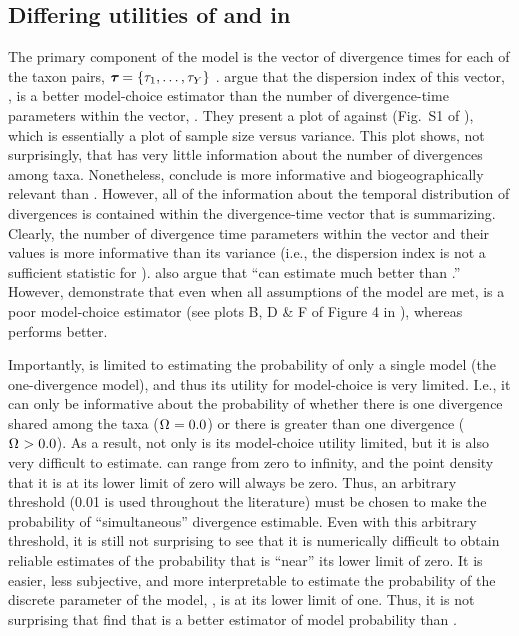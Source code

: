 \subsection{Differing utilities of \numt{} and \vmratio{} in \msb}
The primary component of the \msb model is the vector of divergence
times for each of the taxon pairs,
$\boldsymbol{\tau_{}} = \{\tau_{1}, \ldots, \tau_{Y}\}$
\citep{Oaks2012}.
\citet{Hickerson2013} argue that the dispersion index of this vector,
\vmratio{}, is a better model-choice estimator than the number of 
divergence-time parameters within the vector,
\numt{}.
They present a plot of \numt{} against \vmratio{} (Fig.~S1 of
\citet{Hickerson2013}), which is essentially a plot of sample size versus
variance.
This plot shows, not surprisingly, that \vmratio{} has very little information
about the number of divergences among taxa.
Nonetheless, \citet{Hickerson2013} conclude \vmratio{} is more informative and
biogeographically relevant than \numt{}.
However, all of the information about the temporal distribution of divergences
is contained within the divergence-time vector that \vmratio{} is summarizing.
Clearly, the number of divergence time parameters within the vector and their
values is more informative than its variance (i.e., the dispersion index is not
a sufficient statistic for \divtvector).
\citet{Hickerson2013} also argue that ``\msb can estimate \vmratio{} much
better than \numt{}.''
However, \citet{Oaks2012} demonstrate that even when all assumptions of the
model are met, \vmratio{} is a poor model-choice estimator (see plots B, D \& F
of Figure 4 in \citet{Oaks2012}), whereas \numt{} performs better.

Importantly, \vmratio{} is limited to estimating the probability of only a
single model (the one-divergence model), and thus its utility for model-choice
is very limited.
I.e., it can only be informative about the probability of whether there is one
divergence shared among the taxa ($\Omega_{} = 0.0$) or there is greater than
one divergence ($\Omega_{} > 0.0$).
As a result, not only is its model-choice utility limited, but it is also
very difficult to estimate.
\vmratio{} can range from zero to infinity, and the point density that it is
at its lower limit of zero will always be zero.
Thus, an arbitrary threshold (0.01 is used throughout the \msb literature) must
be chosen to make the probability of ``simultaneous'' divergence estimable.
Even with this arbitrary threshold, it is still not surprising to see that it
is numerically difficult to obtain reliable estimates of the probability that
\vmratio{} is ``near'' its lower limit of zero.
It is easier, less subjective, and more interpretable to estimate the
probability of the discrete parameter of the model, \numt{}, is at its lower
limit of one.
Thus, it is not surprising that \citet{Oaks2012} find that \numt{} is a better
estimator of model probability than \vmratio{}.

